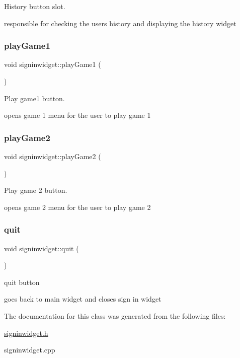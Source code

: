 History button slot. 

responsible for checking the users history and displaying the history widget \mbox{\label{classsigninwidget_a885c28fa8a2f7bb105049645f6b28de9}} 
\subsubsection{\texorpdfstring{play\+Game1}{playGame1}}
{\footnotesize\ttfamily void signinwidget\+::play\+Game1 (\begin{DoxyParamCaption}{ }\end{DoxyParamCaption})\hspace{0.3cm}{\ttfamily [slot]}}



Play game1 button. 

opens game 1 menu for the user to play game 1 \mbox{\label{classsigninwidget_a5f450a4cfdb5151fd1e3254f094d0265}} 
\subsubsection{\texorpdfstring{play\+Game2}{playGame2}}
{\footnotesize\ttfamily void signinwidget\+::play\+Game2 (\begin{DoxyParamCaption}{ }\end{DoxyParamCaption})\hspace{0.3cm}{\ttfamily [slot]}}



Play game 2 button. 

opens game 2 menu for the user to play game 2 \mbox{\label{classsigninwidget_a873db27ec0eb7d4b758fac6d8f39519a}} 
\subsubsection{\texorpdfstring{quit}{quit}}
{\footnotesize\ttfamily void signinwidget\+::quit (\begin{DoxyParamCaption}{ }\end{DoxyParamCaption})\hspace{0.3cm}{\ttfamily [slot]}}



quit button 

goes back to main widget and closes sign in widget 

The documentation for this class was generated from the following files\+:\begin{DoxyCompactItemize}
\item 
\hyperlink{signinwidget_8h}{signinwidget.\+h}\item 
signinwidget.\+cpp\end{DoxyCompactItemize}
